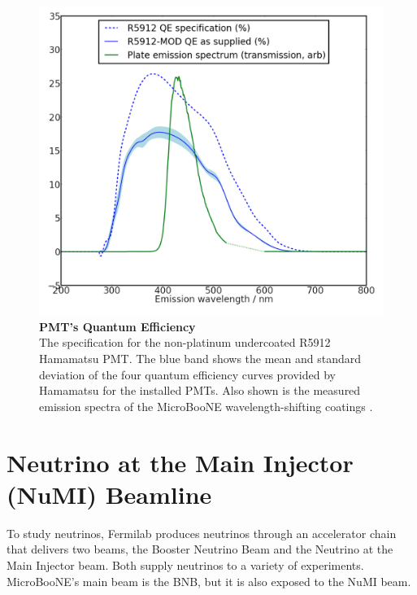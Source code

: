 \begin{figure}[h!]
    \begin{center}
        \includegraphics[scale=0.4]{Figures/quantum_eff.png}
        \caption[PMT's Quantum Efficiency]{{\textbf{PMT's Quantum Efficiency}} \\The specification for the non-platinum undercoated R5912 Hamamatsu PMT. The blue band shows the mean and standard deviation of the four quantum efficiency curves provided by Hamamatsu for the installed PMTs. Also shown is the measured emission spectra of the MicroBooNE wavelength-shifting coatings \cite{microboone_design}.}
        \label{pmt_quantum_eff} 
    \end{center}
\end{figure}
  

\section{Neutrino at the Main Injector (NuMI) Beamline}
  
To study neutrinos, Fermilab produces neutrinos through an accelerator chain that delivers two beams, the Booster Neutrino Beam and the Neutrino at the Main Injector beam. Both supply neutrinos to a variety of experiments. MicroBooNE's main beam is the BNB,  but it is also exposed to the NuMI beam. 
  
